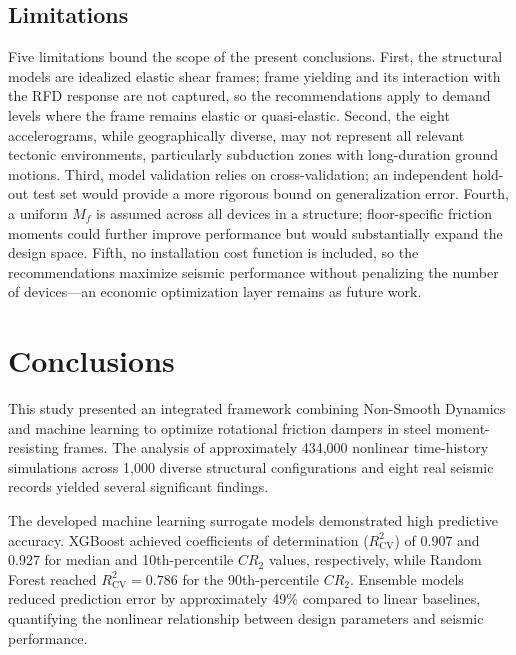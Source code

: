 \documentclass[preprint,12pt,authoryear]{elsarticle}
\newcommand{\Rsq}{R^{2}_{\mathrm{CV}}}
\newcommand{\Mf}{M_{\!f}}
\begin{document}
\subsection{Limitations}

Five limitations bound the scope of the present conclusions.
First, the structural models are idealized elastic shear frames; frame
yielding and its interaction with the RFD response are not captured, so
the recommendations apply to demand levels where the frame remains elastic
or quasi-elastic. Second, the eight accelerograms, while geographically
diverse, may not represent all relevant tectonic environments, particularly
subduction zones with long-duration ground motions. Third, model validation
relies on cross-validation; an independent hold-out test set would provide a
more rigorous bound on generalization error. Fourth, a uniform $\Mf$ is
assumed across all devices in a structure; floor-specific friction moments
could further improve performance but would substantially expand the design
space. Fifth, no installation cost function is included, so the
recommendations maximize seismic performance without penalizing the number
of devices---an economic optimization layer remains as future work.

\section{Conclusions}
\label{sec:conclusions}

This study presented an integrated framework combining Non-Smooth Dynamics and machine learning to optimize rotational friction dampers in steel moment-resisting frames. The analysis of approximately 434,000 nonlinear time-history simulations across 1,000 diverse structural configurations and eight real seismic records yielded several significant findings.

The developed machine learning surrogate models demonstrated high predictive accuracy. XGBoost achieved coefficients of determination ($\Rsq$) of 0.907 and 0.927 for median and 10th-percentile $CR_2$ values, respectively, while Random Forest reached $\Rsq = 0.786$ for the 90th-percentile $CR_2$. Ensemble models reduced prediction error by approximately 49\% compared to linear baselines, quantifying the nonlinear relationship between design parameters and seismic performance.
\end{document}
